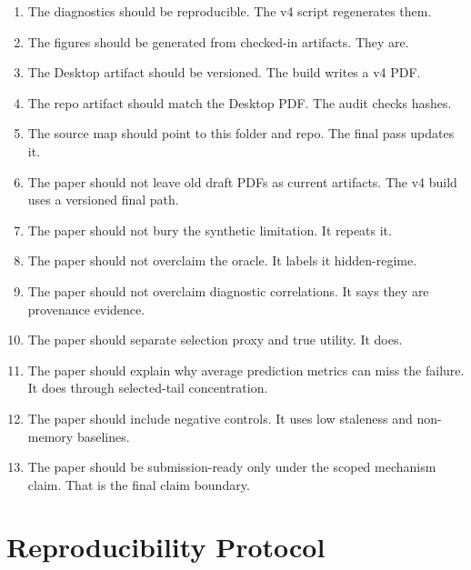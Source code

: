 \documentclass{article}
\begin{document}
\begin{enumerate}
\item The diagnostics should be reproducible. The v4 script regenerates them.
\item The figures should be generated from checked-in artifacts. They are.
\item The Desktop artifact should be versioned. The build writes a v4 PDF.
\item The repo artifact should match the Desktop PDF. The audit checks hashes.
\item The source map should point to this folder and repo. The final pass
updates it.
\item The paper should not leave old draft PDFs as current artifacts. The v4
build uses a versioned final path.
\item The paper should not bury the synthetic limitation. It repeats it.
\item The paper should not overclaim the oracle. It labels it hidden-regime.
\item The paper should not overclaim diagnostic correlations. It says they are
provenance evidence.
\item The paper should separate selection proxy and true utility. It does.
\item The paper should explain why average prediction metrics can miss the
failure. It does through selected-tail concentration.
\item The paper should include negative controls. It uses low staleness and
non-memory baselines.
\item The paper should be submission-ready only under the scoped mechanism
claim. That is the final claim boundary.
\end{enumerate}

\section{Reproducibility Protocol}
\label{app:repro}
\end{document}
